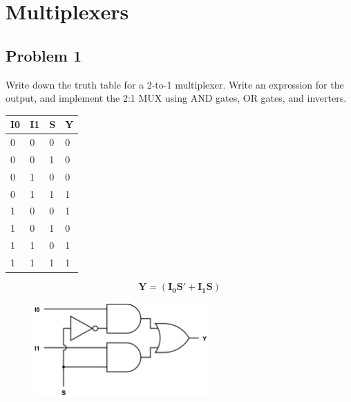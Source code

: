 \documentclass{article}
\begin{document}
\newpage
\section*{Multiplexers}
\subsection*{Problem 1}
Write down the truth table for a 2-to-1 multiplexer. Write an expression for the output, and implement the 2:1 MUX using AND gates, OR gates, and inverters.

\begin{table}[!h]
\centering
\begin{tabular}{|l|l|l|l|}
\hline
\textbf{I0} & \textbf{I1} & \textbf{S} & \textbf{Y} \\ \hline
0           & 0           & 0          & 0          \\ \hline
0           & 0           & 1          & 0          \\ \hline
0           & 1           & 0          & 0          \\ \hline
0           & 1           & 1          & 1          \\ \hline
1           & 0           & 0          & 1          \\ \hline
1           & 0           & 1          & 0          \\ \hline
1           & 1           & 0          & 1          \\ \hline
1           & 1           & 1          & 1          \\ \hline
\end{tabular}
\end{table}
$$\mathbf{Y=(I_0S'+I_1S)}$$
\begin{figure}[!h]
    \centering
    \includegraphics[width=0.6\textwidth]{figures/mux1_solution.png}
\end{figure}

\newpage
\end{document}
